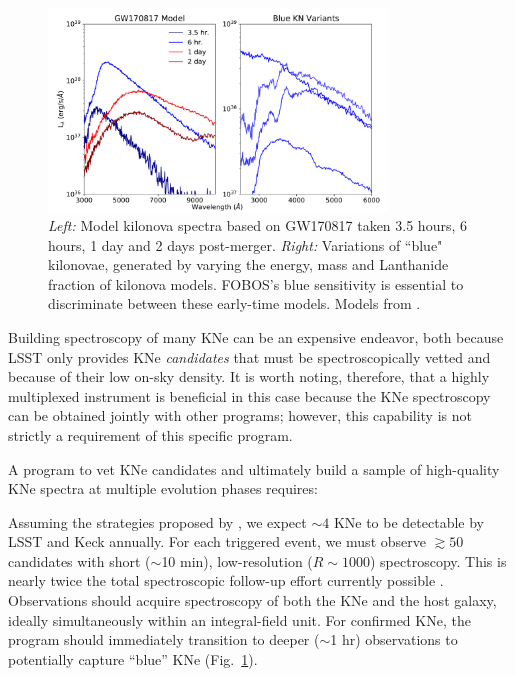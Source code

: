\documentclass[11pt,a4paper,twoside,onecolumn,openany,final,oldfontcommands]{memoir}
\begin{document}

\begin{figure}
\begin{center}
\includegraphics[width=0.8\textwidth]{figs/kn_fobos.pdf}
\end{center}
\caption[Model spectra of kilonovae]{\textit{Left:} Model kilonova spectra based on GW170817 taken 3.5 hours, 6 hours, 1 day and 2 days post-merger. \textit{Right:} Variations of ``blue" kilonovae, generated by varying the energy, mass and Lanthanide fraction of kilonova models. FOBOS's blue sensitivity is essential to discriminate between these early-time models. Models from \citet{kasen2017}.}
\label{fig:kilonova}    
\end{figure}

Building spectroscopy of many KNe can be an expensive endeavor, both because LSST only provides KNe \textit{candidates} that must be spectroscopically vetted and because of their low on-sky density.  It is worth noting, therefore, that a highly multiplexed instrument is beneficial in this case because the KNe spectroscopy can be obtained jointly with other programs; however, this capability is not strictly a requirement of this specific program.

A program to vet KNe candidates and ultimately build a sample of high-quality KNe spectra at multiple evolution phases requires:

\begin{programrequirement}
\reqitem Assuming the strategies proposed by \citet{margutti2018}, we expect $\sim4$ KNe to be detectable by LSST and Keck annually. For each triggered event, we must observe $\gtrsim50$ candidates with short ($\sim$10 min), low-resolution ($R\sim1000$) spectroscopy.  This is nearly twice the total spectroscopic follow-up effort currently possible \citep{hosseinzadeh2019}.
\reqitem Observations should acquire spectroscopy of both the KNe and the host galaxy, ideally simultaneously within an integral-field unit.
\reqitem For confirmed KNe, the program should immediately transition to deeper ($\sim$1 hr) observations to potentially capture ``blue'' KNe (Fig.~\ref{fig:kilonova}).
\end{programrequirement}
\end{document}
